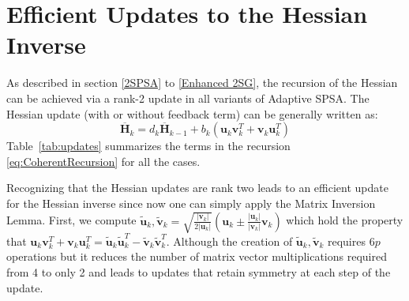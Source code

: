 \documentclass[conference]{IEEEtran}
\newcommand{\bDelta}{\bm{\Delta}}
\newcommand{\oH}{\bm{\overline{H}}}
\newcommand{\remove}[1]{}
\begin{document}
\remove{
We can obtain a rank-2 update from $ \oH_{k-1}^{-1} $ to $ \oH_{k}^{-1} $. The sequential recursion of the $ \oH_k^{-1} $ is as following:
\begin{equation} \label{eq:Enhanced2SGSequentialUpdate}
\begin{dcases}
\bm{B}_k^{-1}
&=\oH_{k-1}^{-1}-\oH_{k-1}^{-1}\bm{b}_k\\
&~~~\cdot(1+\bDelta_k^{-T}\oH_{k-1}^{-1}\bm{b}_k)^{-1}\bDelta_k^{-T}\oH_{k-1}^{-1}\\
\oH_k^{-1}
&=\bm{B}_k^{-1}-\bm{B}_k^{-1}\bDelta_k\\
&~~~\cdot(1+\bm{b}_k^{T}\bm{B}_k^{-1}\bDelta_k)^{-1}\bm{b}_k^{T}\bm{B}_k^{-1}
\end{dcases}
\end{equation}
where
\begin{equation} \label{eq:Enhanced2SGB}
\bm{B}_k=\oH_{k-1}+\bm{b}_k\bDelta_k^{-T}
\end{equation}

Now we analyze the FLOPs of the sequential update \ref{eq:Enhanced2SGSequentialUpdate}, compared with the original algorithm \ref{eq:Enhancement}:
}


\section{Efficient Updates to the Hessian Inverse}
As described in section \ref{2SPSA} to \ref{Enhanced 2SG}, the
recursion of the Hessian can be achieved via a rank-2 update in all
variants of Adaptive SPSA.
The Hessian update (with or without feedback term) can be
generally written as:
\begin{equation} \label{eq:CoherentRecursion}
\oH_{k}=d_k\oH_{k-1}+b_k(\bm{u}_k \bm{v}_k^{T}+\bm{v}_k \bm{u}_k^{T})
\end{equation}
Table~\ref{tab:updates} summarizes the terms in the recursion
\ref{eq:CoherentRecursion} for all the cases.

Recognizing that the Hessian updates are rank two leads to an
efficient update for the Hessian inverse since now one can simply apply the
Matrix Inversion Lemma.
First, we compute $\bm{\tilde{u}}_k, \bm{\tilde{v}}_k =
\sqrt{\frac{|\bm{v}_k|}{2|\bm{u}_k|}} (\bm{u}_k \pm
\frac{|\bm{u}_k|}{|\bm{v}_k|}\bm{v}_k)$ which hold the property that
$\bm{u}_k \bm{v}_k^{T}+\bm{v}_k \bm{u}_k^{T} = \bm{\tilde{u}}_k
\bm{\tilde{u}}_k^{T} - \bm{\tilde{v}}_k \bm{\tilde{v}}_k^{T}$.
Although the creation of $\bm{\tilde{u}}_k, \bm{\tilde{v}}_k$ requires
$6p$ operations but it reduces the number of matrix vector multiplications
required from 4 to only 2 and leads to updates that retain symmetry at
each step of the update.
\end{document}
